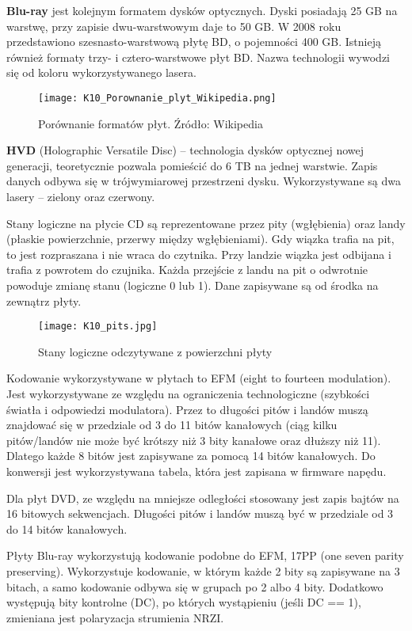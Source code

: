 \textbf{Blu-ray} jest kolejnym formatem dysków optycznych. Dyski posiadają 25 GB na warstwę, przy zapisie dwu-warstwowym daje to 50 GB. W 2008 roku przedstawiono szesnasto-warstwową płytę BD, o pojemności 400 GB. Istnieją również formaty trzy- i cztero-warstwowe płyt BD. Nazwa technologii wywodzi się od koloru wykorzystywanego lasera. 

\begin{figure}[H]
\caption{Porównanie formatów płyt. Źródło: Wikipedia}
\centering
\texttt{[image: K10\_Porownanie\_plyt\_Wikipedia.png]}
\end{figure}

\textbf{HVD} (Holographic Versatile Disc) -- technologia dysków optycznej nowej generacji, teoretycznie pozwala pomieścić do 6 TB na jednej warstwie. Zapis danych odbywa się w trójwymiarowej przestrzeni dysku. Wykorzystywane są dwa lasery -- zielony oraz czerwony.

Stany logiczne na płycie CD są reprezentowane przez pity (wgłębienia) oraz landy (płaskie powierzchnie, przerwy między wgłębieniami). Gdy wiązka trafia na pit, to jest rozpraszana i nie wraca do czytnika. Przy landzie wiązka jest odbijana i trafia z powrotem do czujnika. Każda przejście z landu na pit o odwrotnie powoduje zmianę stanu (logiczne 0 lub 1). Dane zapisywane są od środka na zewnątrz płyty.

\begin{figure}[H]
\caption{Stany logiczne odczytywane z powierzchni płyty}
\centering
\texttt{[image: K10\_pits.jpg]}
\end{figure}

Kodowanie wykorzystywane w płytach to EFM (eight to fourteen modulation). Jest wykorzystywane ze względu na ograniczenia technologiczne (szybkości światła i odpowiedzi modulatora). Przez to długości pitów i landów muszą znajdować się w przedziale od 3 do 11 bitów kanałowych (ciąg kilku pitów/landów nie może być krótszy niż 3 bity kanałowe oraz dłuższy niż 11). Dlatego każde 8 bitów jest zapisywane za pomocą 14 bitów kanałowych. Do konwersji jest wykorzystywana tabela, która jest zapisana w firmware napędu. 

Dla płyt DVD, ze względu na mniejsze odległości stosowany jest zapis bajtów na 16 bitowych sekwencjach. Długości pitów i landów muszą być w przedziale od 3 do 14 bitów kanałowych.

Płyty Blu-ray wykorzystują kodowanie podobne do EFM, 17PP (one seven parity preserving). Wykorzystuje kodowanie, w którym każde 2 bity są zapisywane na 3 bitach, a samo kodowanie odbywa się w grupach po 2 albo 4 bity. Dodatkowo występują bity kontrolne (DC), po których wystąpieniu (jeśli DC == 1), zmieniana jest polaryzacja strumienia NRZI.

